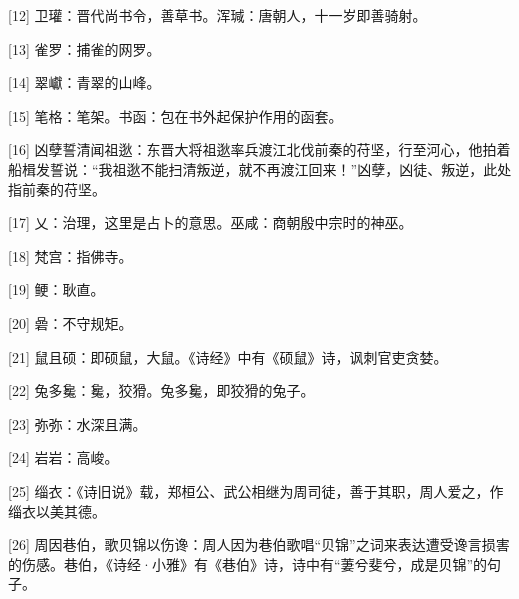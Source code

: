 \documentclass[12pt,UTF8]{ctexbook}
\begin{document}
[12] 卫瓘：晋代尚书令，善草书。浑瑊：唐朝人，十一岁即善骑射。

[13] 雀罗：捕雀的网罗。

[14] 翠巘：青翠的山峰。

[15] 笔格：笔架。书函：包在书外起保护作用的函套。

[16] 凶孽誓清闻祖逖：东晋大将祖逖率兵渡江北伐前秦的苻坚，行至河心，他拍着船楫发誓说：“我祖逖不能扫清叛逆，就不再渡江回来！”凶孽，凶徒、叛逆，此处指前秦的苻坚。

[17] 乂：治理，这里是占卜的意思。巫咸：商朝殷中宗时的神巫。

[18] 梵宫：指佛寺。

[19] 鲠：耿直。

[20] 碞：不守规矩。

[21] 鼠且硕：即硕鼠，大鼠。《诗经》中有《硕鼠》诗，讽刺官吏贪婪。

[22] 兔多毚：毚，狡猾。兔多毚，即狡猾的兔子。

[23] 弥弥：水深且满。

[24] 岩岩：高峻。

[25] 缁衣：《诗旧说》载，郑桓公、武公相继为周司徒，善于其职，周人爱之，作缁衣以美其德。

[26] 周因巷伯，歌贝锦以伤谗：周人因为巷伯歌唱“贝锦”之词来表达遭受谗言损害的伤感。巷伯，《诗经·小雅》有《巷伯》诗，诗中有“萋兮斐兮，成是贝锦”的句子。

\backmatter
\end{document}
